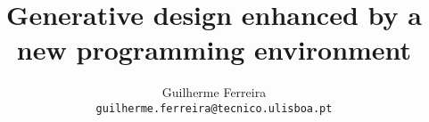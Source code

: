 \documentclass[runningheads,a4paper]{llncs2e/llncs}
\begin{document}
\title{Generative design enhanced by a new programming environment}
\author{Guilherme Ferreira \\ \texttt{guilherme.ferreira@tecnico.ulisboa.pt}}

\maketitle

%
%
%
%

%
%
%

%

% 
% 
 

 
\end{document}
